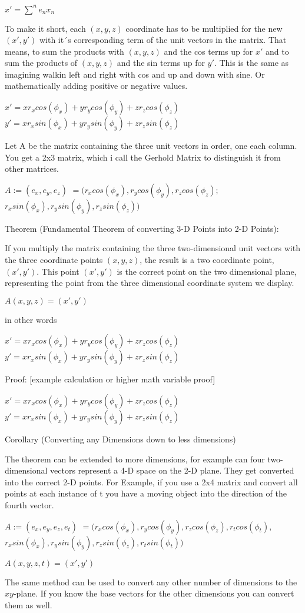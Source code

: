 \documentclass{article}
\begin{document}
$x' = \displaystyle\sum^{n} e_nx_n$

To make it short, each $(x,y,z)$ coordinate has to be multiplied for the new $(x',y')$
with it´s corresponding term of the unit vectors in the matrix. That means,
to sum the products with $(x,y,z)$ and the cos terms up for $x'$ and to sum the products
of $(x,y,z)$ and the sin terms up for $y'$. This is the same as imagining walkin left and
right with cos and up and down with sine. Or mathematically adding positive or negative values.

$x' = xr_xcos(\phi_x) + yr_ycos(\phi_y) + zr_zcos(\phi_z)$
$y' = xr_xsin(\phi_x) + yr_ysin(\phi_y) + zr_zsin(\phi_z)$

Let A be the matrix containing the three unit vectors in order, one each
column. You get a 2x3 matrix, which i call the Gerhold Matrix to distinguish 
it from other matrices.

$A := (e_x, e_y, e_z)$
$  = (r_xcos(\phi_x), r_ycos(\phi_y), r_zcos(\phi_z);$
$     r_xsin(\phi_x), r_ysin(\phi_y), r_zsin(\phi_z))$

Theorem (Fundamental Theorem of converting 3-D Points into 2-D Points):

If you multiply the matrix containing the three two-dimensional unit vectors
with the three coordinate points $(x,y,z)$, the result is a two coordinate point, 
$(x',y')$. This point $(x',y')$ is the correct point on the two dimensional plane,
representing the point from the three dimensional coordinate system we display.

$A(x,y,z) = (x',y')$

in other words

$x' = xr_xcos(\phi_x) + yr_ycos(\phi_y) + zr_zcos(\phi_z)$
$y' = xr_xsin(\phi_x) + yr_ysin(\phi_y) + zr_zsin(\phi_z)$

Proof:
[example calculation or higher math variable proof]

$x' = xr_xcos(\phi_x) + yr_ycos(\phi_y) + zr_zcos(\phi_z)$
$y' = xr_xsin(\phi_x) + yr_ysin(\phi_y) + zr_zsin(\phi_z)$

Corollary (Converting any Dimensions down to less dimensions)

The theorem can be extended to more dimensions, for example can four two-dimensional
vectors represent a 4-D space on the 2-D plane. They get converted into the correct
2-D points. For Example, if you use a 2x4 matrix and convert all points at each 
instance of t you have a moving object into the direction of the fourth vector. 

$A := (e_x, e_y, e_z, e_t)$
$  = (r_xcos(\phi_x), r_ycos(\phi_y), r_zcos(\phi_z), r_tcos(\phi_t),$
$     r_xsin(\phi_x), r_ysin(\phi_y), r_zsin(\phi_z), r_tsin(\phi_t))$

$A(x,y,z,t)=(x',y')$

The same method can be used to convert any other number of dimensions to the $xy$-plane.
If you know the base vectors for the other dimensions you can convert them as well.
\end{document}
